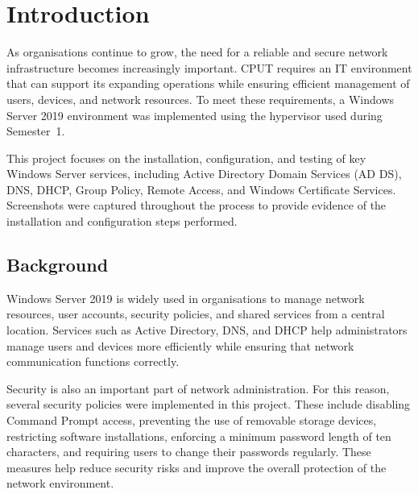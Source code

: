 \chapter{Introduction}
\label{chap:intro}

As organisations continue to grow, the need for a reliable and secure network infrastructure becomes increasingly important. CPUT requires an IT environment that can support its expanding operations while ensuring efficient management of users, devices, and network resources. To meet these requirements, a Windows Server 2019 environment was implemented using the hypervisor used during Semester~1.

This project focuses on the installation, configuration, and testing of key Windows Server services, including Active Directory Domain Services (AD DS), DNS, DHCP, Group Policy, Remote Access, and Windows Certificate Services. Screenshots were captured throughout the process to provide evidence of the installation and configuration steps performed.

\section{Background}
\label{sec:intro-background}
Windows Server 2019 is widely used in organisations to manage network resources, user accounts, security policies, and shared services from a central location. Services such as Active Directory, DNS, and DHCP help administrators manage users and devices more efficiently while ensuring that network communication functions correctly.

Security is also an important part of network administration. For this reason, several security policies were implemented in this project. These include disabling Command Prompt access, preventing the use of removable storage devices, restricting software installations, enforcing a minimum password length of ten characters, and requiring users to change their passwords regularly. These measures help reduce security risks and improve the overall protection of the network environment.

